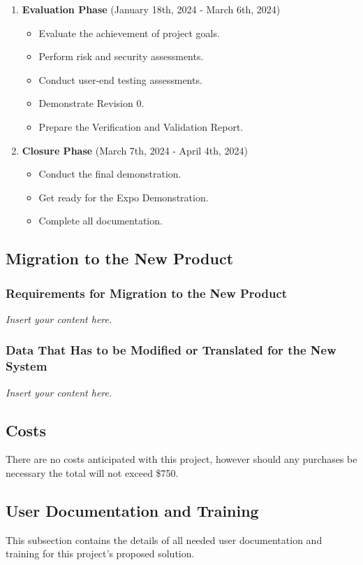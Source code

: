 \documentclass[12pt]{article}
\newcommand{\lips}{\textit{Insert your content here.}}
\begin{document}
\begin{enumerate}
      \item \textbf{Evaluation Phase} (January 18th, 2024 - March 6th, 2024)
      \begin{itemize}
        \item Evaluate the achievement of project goals.
        \item Perform risk and security assessments.
        \item Conduct user-end testing assessments.
        \item Demonstrate Revision 0.
        \item Prepare the Verification and Validation Report.
      \end{itemize}
    
      \item \textbf{Closure Phase} (March 7th, 2024 - April 4th, 2024)
      \begin{itemize}
        \item Conduct the final demonstration.
        \item Get ready for the Expo Demonstration.
        \item Complete all documentation.
      \end{itemize}
    \end{enumerate}

\subsection{Migration to the New Product}

\subsubsection{Requirements for Migration to the New Product}
\lips
\subsubsection{Data That Has to be Modified or Translated for the New System}
\lips

\subsection{Costs}
There are no costs anticipated with this project, however should any purchases be necessary the total will not exceed \$750.

\subsection{User Documentation and Training}
This subsection contains the details of all needed user documentation and training for this project's proposed solution.
\end{document}
